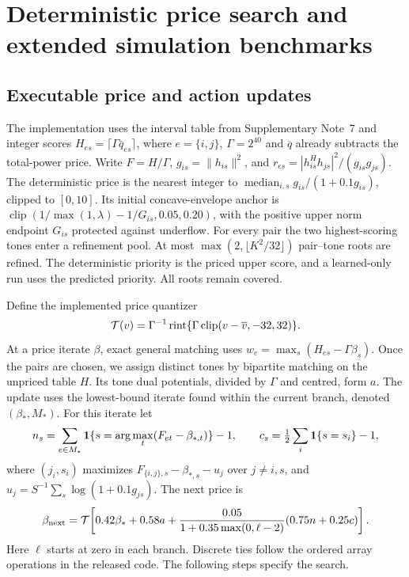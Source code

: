 \documentclass[10pt,letterpaper]{article}
\begin{document}
\FloatBarrier

\section{Deterministic price search and extended simulation benchmarks}\label{supp:note4}

\subsection{Executable price and action updates}
The implementation uses the interval table from Supplementary Note~7 and integer
scores \(H_{es}=\lceil\Gamma\overline q_{es}\rceil\), where \(e=\{i,j\}\),
\(\Gamma=2^{40}\) and \(\overline q\) already subtracts the total-power price.
Write \(F=H/\Gamma\), \(g_{is}=\|h_{is}\|^2\), and
\(r_{es}=|h_{is}^{H}h_{js}|^2/(g_{is}g_{js})\).
The deterministic price is the nearest integer to
\(\operatorname{median}_{i,s}g_{is}/(1+0.1g_{is})\), clipped to \([0,10]\).
Its initial concave-envelope anchor is
\(\operatorname{clip}(1/\max(1,\lambda)-1/G_{is},0.05,0.20)\), with
the positive upper norm endpoint \(G_{is}\) protected against underflow.
For every pair the two highest-scoring tones enter a refinement pool.
At most \(\max(2,\lfloor K^2/32\rfloor)\) pair--tone roots are refined.
The deterministic priority is the priced upper score, and a learned-only run uses
the predicted priority. All roots remain covered.

Define the implemented price quantizer
\[
 {\cal T}(v)=\Gamma^{-1}\operatorname{rint}
 \{\Gamma\operatorname{clip}(v-\overline v,-32,32)\}.
\]
At a price iterate \(\beta\), exact general matching uses
\(w_e=\max_s(H_{es}-\Gamma\beta_s)\).
Once the pairs are chosen, we assign distinct tones by bipartite matching on the unpriced table \(H\).
Its tone dual potentials, divided by \(\Gamma\) and centred, form \(a\).
The update uses the lowest-bound iterate found within the current branch,
denoted \((\beta_*,M_*)\). For this iterate let
\[
 n_s=\sum_{e\in M_*}{\bf1}
 \{s=\arg\max_t(F_{et}-\beta_{*,t})\}-1,\qquad
 c_s=\tfrac12\sum_i{\bf1}\{s=s_i\}-1 ,
\]
where \((j_i,s_i)\) maximizes \(F_{\{i,j\},s}-\beta_{*,s}-u_j\) over
\(j\ne i,s\), and \(u_j=S^{-1}\sum_s\log(1+0.1g_{js})\).
The next price is
\begin{equation}\label{supp:priceupdate}
 \beta_{\rm next}={\cal T}\!\left[
 0.42\beta_*+0.58a+
 \frac{0.05}{1+0.35\max(0,\ell-2)}
 (0.75n+0.25c)\right].
\end{equation}
Here \(\ell\) starts at zero in each branch. Discrete ties follow the ordered
array operations in the released code. The following steps specify the search.
\end{document}
